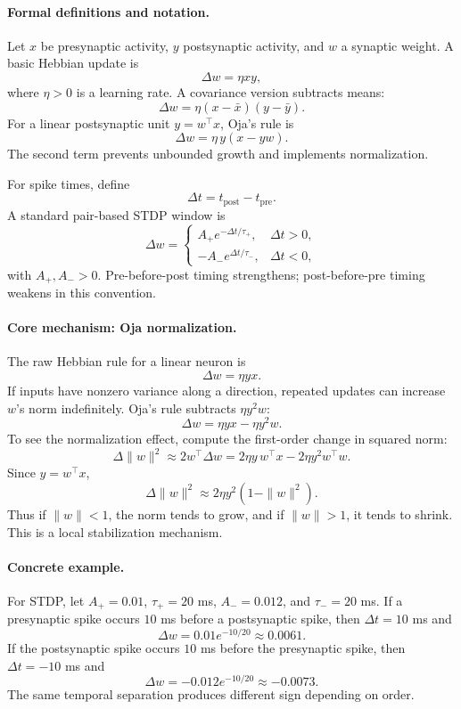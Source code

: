 \paragraph{Formal definitions and notation.}
Let \(x\) be presynaptic activity, \(y\) postsynaptic activity, and \(w\) a synaptic weight. A basic Hebbian update is
\[
\Delta w=\eta xy,
\]
where \(\eta>0\) is a learning rate. A covariance version subtracts means:
\[
\Delta w=\eta (x-\bar x)(y-\bar y).
\]
For a linear postsynaptic unit \(y=w^\top x\), Oja's rule is
\[
\Delta w=\eta\, y(x-yw).
\]
The second term prevents unbounded growth and implements normalization.

For spike times, define
\[
\Delta t=t_{\mathrm{post}}-t_{\mathrm{pre}}.
\]
A standard pair-based STDP window is
\[
\Delta w=
\begin{cases}
A_+ e^{-\Delta t/\tau_+}, & \Delta t>0,\\
-A_- e^{\Delta t/\tau_-}, & \Delta t<0,
\end{cases}
\]
with \(A_+,A_->0\). Pre-before-post timing strengthens; post-before-pre timing weakens in this convention.

\paragraph{Core mechanism: Oja normalization.}
The raw Hebbian rule for a linear neuron is
\[
\Delta w=\eta yx.
\]
If inputs have nonzero variance along a direction, repeated updates can increase \(w\)'s norm indefinitely. Oja's rule subtracts \(\eta y^2w\):
\[
\Delta w=\eta yx-\eta y^2w.
\]
To see the normalization effect, compute the first-order change in squared norm:
\[
\Delta \|w\|^2
\approx 2w^\top\Delta w
=2\eta y\,w^\top x-2\eta y^2 w^\top w.
\]
Since \(y=w^\top x\),
\[
\Delta \|w\|^2
\approx 2\eta y^2(1-\|w\|^2).
\]
Thus if \(\|w\|<1\), the norm tends to grow, and if \(\|w\|>1\), it tends to shrink. This is a local stabilization mechanism.

\paragraph{Concrete example.}
For STDP, let \(A_+=0.01\), \(\tau_+=20\) ms, \(A_-=0.012\), and \(\tau_-=20\) ms. If a presynaptic spike occurs \(10\) ms before a postsynaptic spike, then \(\Delta t=10\) ms and
\[
\Delta w=0.01e^{-10/20}\approx0.0061.
\]
If the postsynaptic spike occurs \(10\) ms before the presynaptic spike, then \(\Delta t=-10\) ms and
\[
\Delta w=-0.012e^{-10/20}\approx-0.0073.
\]
The same temporal separation produces different sign depending on order.

